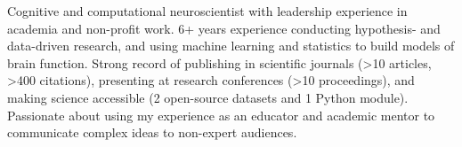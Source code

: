 

\begin{cvparagraph}

Cognitive and computational neuroscientist with leadership experience in academia and non-profit work. 6+ years experience conducting hypothesis- and data-driven research, and using machine learning and statistics to build models of brain function. Strong record of publishing in scientific journals (>10 articles, >400 citations), presenting at research conferences (>10 proceedings), and making science accessible (2 open-source datasets and 1 Python module). Passionate about using my experience as an educator and academic mentor to communicate complex ideas to non-expert audiences. 

\end{cvparagraph}
